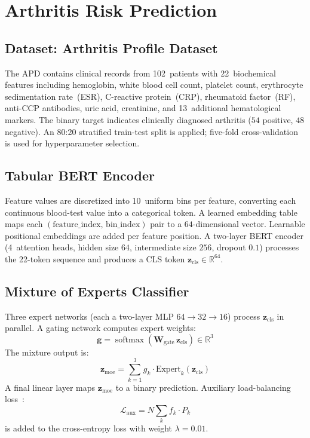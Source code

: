 \documentclass[journal,10pt,twoside]{IEEEtran}
\newcommand{\RR}{\mathbb{R}}
\newcommand{\myvec}[1]{\mathbf{#1}}
\DeclareMathOperator{\softmax}{softmax}
\begin{document}
\section{Arthritis Risk Prediction}
\label{sec:arthritis}

\subsection{Dataset: Arthritis Profile Dataset}

The APD contains clinical records from 102~patients with 22~biochemical features
including hemoglobin, white blood cell count, platelet count, erythrocyte
sedimentation rate~(ESR), C-reactive protein~(CRP), rheumatoid factor~(RF),
anti-CCP antibodies, uric acid, creatinine, and 13~additional hematological markers.
The binary target indicates clinically diagnosed arthritis ($54$ positive,
$48$ negative).
An 80:20 stratified train-test split is applied; five-fold cross-validation is used
for hyperparameter selection.

\subsection{Tabular BERT Encoder}

Feature values are discretized into 10~uniform bins per feature, converting each
continuous blood-test value into a categorical token.
A learned embedding table maps each $(\text{feature\_index},\, \text{bin\_index})$
pair to a $64$-dimensional vector.
Learnable positional embeddings are added per feature position.
A two-layer BERT encoder (4~attention heads, hidden size $64$, intermediate size $256$,
dropout $0.1$) processes the 22-token sequence and produces a CLS token
$\myvec{z}_\text{cls} \in \RR^{64}$.

\subsection{Mixture of Experts Classifier}

Three expert networks (each a two-layer MLP $64{\to}32{\to}16$) process
$\myvec{z}_\text{cls}$ in parallel.
A gating network computes expert weights:
\begin{equation}
  \myvec{g} = \softmax\!\left(\myvec{W}_\text{gate}\,\myvec{z}_\text{cls}\right)
              \in \RR^3
\end{equation}
The mixture output is:
\begin{equation}
  \myvec{z}_\text{moe} = \sum_{k=1}^{3} g_k \cdot \text{Expert}_k(\myvec{z}_\text{cls})
\end{equation}
A final linear layer maps $\myvec{z}_\text{moe}$ to a binary prediction.
Auxiliary load-balancing loss~\cite{shazeer2017}:
\begin{equation}
  \mathcal{L}_\text{aux} = N \sum_k f_k \cdot P_k
\end{equation}
is added to the cross-entropy loss with weight $\lambda{=}0.01$.
\end{document}
